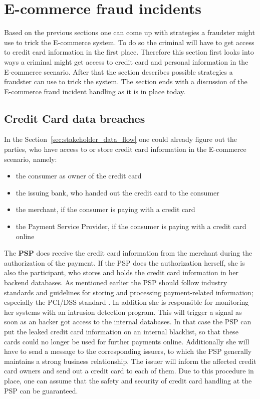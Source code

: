 
\section{E-commerce fraud incidents}
\label{sec:scenario_fraud}

Based on the previous sections one can come up with strategies a fraudster might use to trick the E-commerce system. To do so the criminal will have to get access to credit card information in the first place. Therefore this section first looks into ways a criminal might get access to credit card and personal information in the E-commerce scenario. After that the section describes possible strategies a fraudster can use to trick the system. The section ends with a discussion of the E-commerce fraud incident handling as it is in place today.

\subsection{Credit Card data breaches}
\label{subsec:leaking_credit_cards}

 In the Section~\ref{sec:stakeholder_data_flow} one could already figure out the parties, who have access to or store credit card information in the E-commerce scenario, namely:\@

\begin{itemize}
  \item the consumer as owner of the credit card
  \item the issuing bank, who handed out the credit card to the consumer
  \item the merchant, if the consumer is paying with a credit card
  \item the Payment Service Provider, if the consumer is paying with a credit card online
\end{itemize}

The \textbf{\gls{PSP}} does receive the credit card information from the merchant during the authorization of the payment. If the \gls{PSP} does the authorization herself, she is also the participant, who stores and holds the credit card information in her backend databases. As mentioned earlier the \gls{PSP} should follow industry standards and guidelines for storing and processing payment-related information; especially the PCI/DSS standard \citep{virtue2009payment}. In addition she is responsible for monitoring her systems with an intrusion detection program. This will trigger a signal as soon as an hacker got access to the internal databases. In that case the \gls{PSP} can put the leaked credit card information on an internal blacklist, so that these cards could no longer be used for further payments online. Additionally she will have to send a message to the corresponding issuers, to which the \gls{PSP} generally maintains a strong business relationship. The issuer will inform the affected credit card owners and send out a credit card to each of them. Due to this procedure in place, one can assume that the safety and security of credit card handling at the \gls{PSP} can be guaranteed. \\

